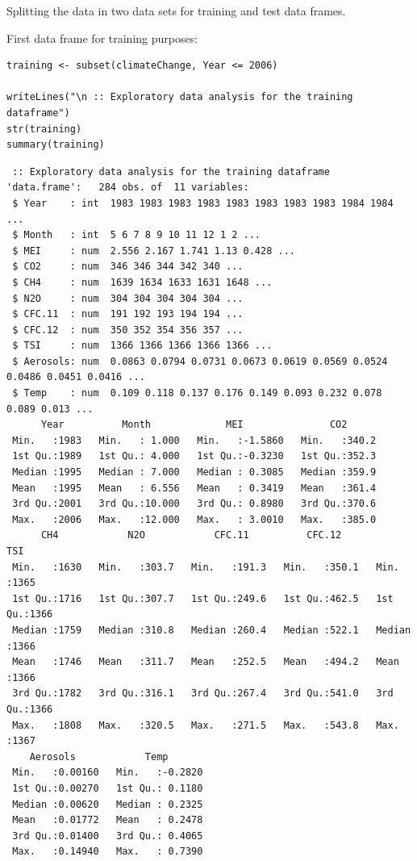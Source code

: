 \documentclass[letterpaper, 9pt, onecolumn, twoside, technote, final]{IEEEtran}
\begin{document}
Splitting the data in two data sets for training and test data frames.

First data frame for training purposes:

\begin{verbatim}
training <- subset(climateChange, Year <= 2006)

writeLines("\n :: Exploratory data analysis for the training dataframe")
str(training)
summary(training)
\end{verbatim}

\begin{verbatim}
 :: Exploratory data analysis for the training dataframe
'data.frame':	284 obs. of  11 variables:
 $ Year    : int  1983 1983 1983 1983 1983 1983 1983 1983 1984 1984 ...
 $ Month   : int  5 6 7 8 9 10 11 12 1 2 ...
 $ MEI     : num  2.556 2.167 1.741 1.13 0.428 ...
 $ CO2     : num  346 346 344 342 340 ...
 $ CH4     : num  1639 1634 1633 1631 1648 ...
 $ N2O     : num  304 304 304 304 304 ...
 $ CFC.11  : num  191 192 193 194 194 ...
 $ CFC.12  : num  350 352 354 356 357 ...
 $ TSI     : num  1366 1366 1366 1366 1366 ...
 $ Aerosols: num  0.0863 0.0794 0.0731 0.0673 0.0619 0.0569 0.0524 0.0486 0.0451 0.0416 ...
 $ Temp    : num  0.109 0.118 0.137 0.176 0.149 0.093 0.232 0.078 0.089 0.013 ...
      Year          Month             MEI               CO2
 Min.   :1983   Min.   : 1.000   Min.   :-1.5860   Min.   :340.2
 1st Qu.:1989   1st Qu.: 4.000   1st Qu.:-0.3230   1st Qu.:352.3
 Median :1995   Median : 7.000   Median : 0.3085   Median :359.9
 Mean   :1995   Mean   : 6.556   Mean   : 0.3419   Mean   :361.4
 3rd Qu.:2001   3rd Qu.:10.000   3rd Qu.: 0.8980   3rd Qu.:370.6
 Max.   :2006   Max.   :12.000   Max.   : 3.0010   Max.   :385.0
      CH4            N2O            CFC.11          CFC.12           TSI
 Min.   :1630   Min.   :303.7   Min.   :191.3   Min.   :350.1   Min.   :1365
 1st Qu.:1716   1st Qu.:307.7   1st Qu.:249.6   1st Qu.:462.5   1st Qu.:1366
 Median :1759   Median :310.8   Median :260.4   Median :522.1   Median :1366
 Mean   :1746   Mean   :311.7   Mean   :252.5   Mean   :494.2   Mean   :1366
 3rd Qu.:1782   3rd Qu.:316.1   3rd Qu.:267.4   3rd Qu.:541.0   3rd Qu.:1366
 Max.   :1808   Max.   :320.5   Max.   :271.5   Max.   :543.8   Max.   :1367
    Aerosols            Temp
 Min.   :0.00160   Min.   :-0.2820
 1st Qu.:0.00270   1st Qu.: 0.1180
 Median :0.00620   Median : 0.2325
 Mean   :0.01772   Mean   : 0.2478
 3rd Qu.:0.01400   3rd Qu.: 0.4065
 Max.   :0.14940   Max.   : 0.7390
\end{verbatim}
\end{document}
